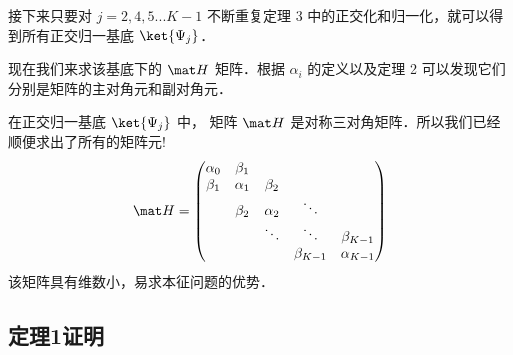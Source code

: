 接下来只要对 $j = 2,4,5...K - 1$ 不断重复定理 3 中的正交化和归一化，就可以得到所有正交归一基底 $\ket{\Psi _j} $．

现在我们来求该基底下的 $\mat H$ 矩阵．根据 $\alpha_i$ 的定义以及定理 2 可以发现它们分别是矩阵的主对角元和副对角元．

{\noindent {}}
在正交归一基底 $\ket{\Psi _j}$ 中， 矩阵 $\mat H$ 是对称三对角矩阵．所以我们已经顺便求出了所有的矩阵元!
\begin{equation}
\mat H =
\begin{pmatrix}
\alpha _0 & \beta _1 &&& \\ 
\beta _1 & \alpha _1 & \beta _2 && \\ 
 & \beta _2 & \alpha _2 & \ddots&  \\ 
& & \ddots& \ddots & {\beta _{K - 1}} \\
&&&\beta_{K - 1} &{\alpha _{K - 1}}
\end{pmatrix}\end{equation}
该矩阵具有维数小，易求本征问题的优势．


\subsection{定理1证明}

